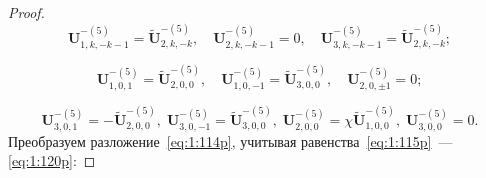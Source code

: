 \begin{proof}
\begin{equation}
\mathbf{U}_{1,k,-k-1}^{-(5)}=\mathbf{\tilde U}_{2,k,-k}^{-(5)},\quad\mathbf{U}_{2,k,-k-1}^{-(5)}=0,\quad\mathbf{U}_{3,k,-k-1}^{-(5)}=\mathbf{\tilde U}_{2,k,-k}^{-(5)};
\label{eq:1:118p}
\end{equation}

\begin{equation}
\mathbf{U}_{1,0,1}^{-(5)}=\mathbf{\tilde U}_{2,0,0}^{-(5)},\quad\mathbf{U}_{1,0,-1}^{-(5)}=\mathbf{\tilde U}_{3,0,0}^{-(5)},\quad\mathbf{U}_{2,0,\pm 1}^{-(5)}=0;
\label{eq:1:119p}
\end{equation}

\begin{equation}
\mathbf{U}_{3,0,1}^{-(5)}=-\mathbf{\tilde U}_{2,0,0}^{-(5)},\;\mathbf{U}_{3,0,-1}^{-(5)}=\mathbf{\tilde U}_{3,0,0}^{-(5)},\;\mathbf{U}_{2,0,0}^{-(5)}=\chi\mathbf{\tilde U}_{1,0,0}^{-(5)},\;\mathbf{U}_{3,0,0}^{-(5)}=0.
\label{eq:1:120p}
\end{equation}
Преобразуем разложение~\eqref{eq:1:114p}, учитывая равенства~\eqref{eq:1:115p}~--- \eqref{eq:1:120p}:


\end{proof}
